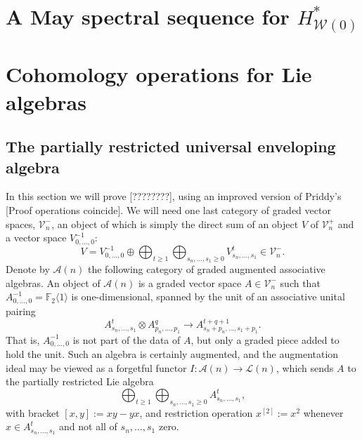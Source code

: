 \documentclass[11pt]{amsart}
\theoremstyle{plain}
\theoremstyle{definition}
\renewcommand{\to}{\longrightarrow}
\newcommand{\calA}{\mathcal{A}}
\newcommand{\calL}{\mathcal{L}}
\newcommand{\calV}{\mathcal{V}}
\newcommand{\calw}{\mathcal{W}}
\theoremstyle{plain}
\newcommand{\restn}[1]{#1^{[2]}}
\newcommand{\vect}[2]{\calV^{#1}_{#2}}
\newcommand{\F}{\mathbb{F}}
\newcommand{\Ftwo}{\F_2}
\begin{document}
\appendix
\begin{appendices}


\section{\textbf{A May spectral sequence for $H^*_{\calw(0)}$}}

\section{\textbf{Cohomology operations for Lie algebras}}\label{appendix on Lie coh ops}
\subsection{The partially restricted universal enveloping algebra}
In this section we will prove [????????], using an improved version of Priddy's [Proof operations coincide]. We will need one last category of graded vector spaces, $\vect{-}{n}$, an object of which is simply the direct sum of an object $V$ of $\vect{+}{n}$ and a vector space $V_{0,\ldots,0}^{-1}$:
\[V=V^{-1}_{0,\ldots,0}\oplus\bigoplus_{t\geq{1}}\bigoplus_{s_n,\ldots,s_1\geq0}V^t_{s_n,\ldots,s_1}\in\vect{-}{n}.\]
Denote by $\calA(n)$ the following category of graded augmented associative algebras. An object of $\calA(n)$ is a graded vector space
$A\in \vect{-}{n}$ such that $A^{-1}_{0,\ldots,0}=\Ftwo \langle 1\rangle$ is one-dimensional, spanned by the unit of an associative unital pairing
\[A^{t}_{s_n,\ldots,s_1}\otimes A^{q}_{p_n,\ldots,p_1}\to A^{t+q+1}_{s_n+p_n,\ldots,s_1+p_1}.\]
That is, $A_{0,\ldots,0}^{-1}$ is not part of the data of $A$, but only a graded piece added to hold the unit. Such an algebra is certainly augmented, and the augmentation ideal may be viewed as a forgetful functor $I:\calA(n)\to\calL(n)$, which sends $A$ to the partially restricted Lie algebra
\[\bigoplus_{t\geq{1}}\bigoplus_{s_n,\ldots,s_1\geq0}A^t_{s_n,\ldots,s_1},\]
with bracket $[x,y]:=xy-yx$, and restriction operation $\restn{x}:=x^2$ whenever $x\in A^t_{s_n,\ldots,s_1}$ and not all of $s_n,\ldots,s_1$ zero.


\end{appendices}
\end{document}
